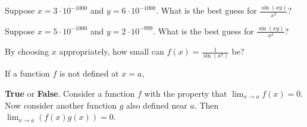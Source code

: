 \documentclass{ximera}
\newcommand{\recommendation}[1]{}
\newcommand{\GoodQuestions}[1]{}
\begin{document}
\begin{shuffle}
\begin{problem}
  Suppose $x = 3 \cdot 10^{-1000}$ and $y = 6 \cdot 10^{-1000}$.  What is the best guess for $\frac{\sin (xy)}{x^2}$?
  \begin{multipleChoice}
  \end{multipleChoice}
\end{problem}

\begin{problem}

  Suppose $x = 5 \cdot 10^{-1000}$ and $y = 2 \cdot 10^{-999}$.  What is the best guess for $\frac{\sin (xy)}{x^2}$?
  \begin{multipleChoice}
  \end{multipleChoice}
\end{problem}

\begin{problem}
  By choosing $x$ appropriately, how small can $f(x) = \frac{1}{\sin (x^2)}$ be?
  \begin{multipleChoice}
  \end{multipleChoice}
\end{problem}



\begin{problem}
  \recommendation{Vic}
  \GoodQuestions{Subject: Limits, 11Q}
If a function $f$ is not defined at $x=a$,
\begin{multipleChoice}
\end{multipleChoice} 
\end{problem}

\begin{problem}
  \recommendation{Vic}
  \GoodQuestions{Subject: Limits 16Q}
  \textbf{True} or \textbf{False}.  Consider a function $f$ with
  the property that $\lim_{x\to a} f(x) =0$.  Now consider another
  function $g$ also defined near $a$.  Then $\lim_{x\to a}
  \left(f(x)g(x)\right) = 0$.
  \begin{multipleChoice}
  \end{multipleChoice}
\end{problem}





\end{shuffle}
\end{document}
